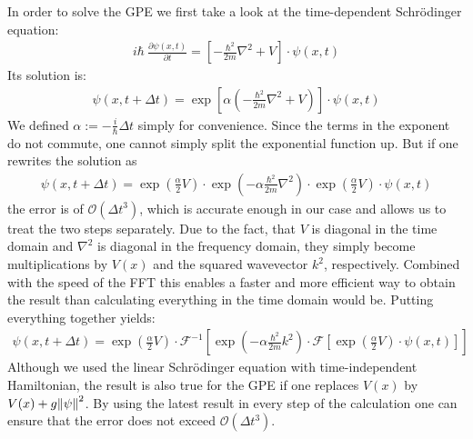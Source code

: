 In order to solve the GPE we first take a look at the time-dependent Schrödinger equation:
\begin{align}
i\hbar\ \frac{\partial\psi(x, t)}{\partial t} =
\left[ -\frac{\hbar^2}{2m} \nabla^2 + V \right] \cdot \psi(x, t)
\end{align}
Its solution is:
\begin{align}
\psi(x,t+\Delta t) = \exp\left[\alpha \left( -\frac{\hbar^2}{2m}\nabla^2 + V\right) \right] \cdot \psi(x,t)
\end{align}
We defined $\displaystyle \alpha := -\frac i \hbar \Delta t $ simply for convenience.
Since the terms in the exponent do not commute, one cannot simply split the exponential function up. But if one rewrites the solution as
\begin{align}
\psi (x,t + \Delta t) = \exp\left(\frac \alpha 2 V\right) \cdot 
\exp\left( -\alpha\frac{\hbar^2}{2m}\nabla^2\right) \cdot
\exp\left(\frac \alpha 2 V \right) \cdot \psi(x,t)
\end{align}
the error is of $\mathcal{O}(\Delta t^3)$, which is accurate enough in our case and allows us to treat the two steps separately. Due to the fact, that $V$ is diagonal in the time domain and $\nabla^2$ is diagonal in the frequency domain, they simply become multiplications by $V(x)$ and the squared wavevector $k^2$, respectively. Combined with the speed of the FFT this enables a faster and more efficient way to obtain the result than calculating everything in the time domain would be.
Putting everything together yields:
\begin{align}
\psi (x,t + \Delta t) = \exp\left(\frac \alpha 2 V\right) \cdot \mathcal{F}^{-1} \left[
\exp\left( -\alpha\frac{\hbar^2}{2m}k^2\right) \cdot \mathcal{F} \left[
 \exp\left(\frac \alpha 2 V \right) \cdot \psi(x,t) \right] \right]
\end{align}
Although we used the linear Schrödinger equation with time-independent Hamiltonian, the result is also true for the GPE if one replaces $V(x)$ by $V(x) + g\norm{\psi}^2$. By using the latest result in every step of the calculation one can ensure that the error does not exceed $\mathcal{O}(\Delta t^3)$.
